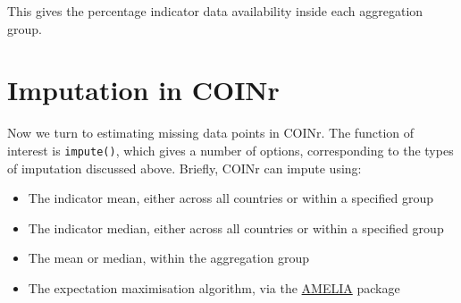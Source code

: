 \documentclass[
]{book}
\newenvironment{Shaded}{\begin{snugshade}}{\end{snugshade}}
\newcommand{\DecValTok}[1]{\textcolor[rgb]{0.00,0.00,0.81}{#1}}
\newcommand{\DocumentationTok}[1]{\textcolor[rgb]{0.56,0.35,0.01}{\textbf{\textit{#1}}}}
\newcommand{\FunctionTok}[1]{\textcolor[rgb]{0.00,0.00,0.00}{#1}}
\newcommand{\NormalTok}[1]{#1}
\newcommand{\SpecialCharTok}[1]{\textcolor[rgb]{0.00,0.00,0.00}{#1}}
\providecommand{\tightlist}{%
  \setlength{\itemsep}{0pt}\setlength{\parskip}{0pt}}
\begin{document}
\begin{Shaded}
\end{Shaded}

This gives the percentage indicator data availability inside each aggregation group.

\hypertarget{imputation-in-coinr}{%
\section{Imputation in COINr}\label{imputation-in-coinr}}

Now we turn to estimating missing data points in COINr. The function of interest is \texttt{impute()}, which gives a number of options, corresponding to the types of imputation discussed above. Briefly, COINr can impute using:

\begin{itemize}
\tightlist
\item
  The indicator mean, either across all countries or within a specified group
\item
  The indicator median, either across all countries or within a specified group
\item
  The mean or median, within the aggregation group
\item
  The expectation maximisation algorithm, via the \href{https://cran.r-project.org/web/packages/Amelia/index.html}{AMELIA} package
\end{itemize}
\end{document}
